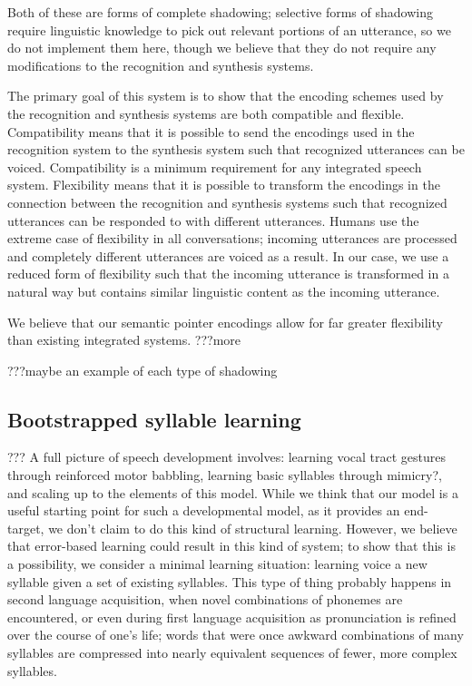 Both of these are forms of complete shadowing;
selective forms of shadowing require linguistic knowledge
to pick out relevant portions of an utterance,
so we do not implement them here,
though we believe that they
do not require any modifications
to the recognition and synthesis systems.

The primary goal of this system is to show that
the encoding schemes used by
the recognition and synthesis systems
are both compatible and flexible.
Compatibility means that it is possible
to send the encodings used in the recognition system
to the synthesis system such that
recognized utterances can be voiced.
Compatibility is a minimum requirement
for any integrated speech system.
Flexibility means that it is possible
to transform the encodings
in the connection between
the recognition and synthesis systems
such that recognized utterances
can be responded to with different utterances.
Humans use the extreme case of flexibility
in all conversations;
incoming utterances are processed
and completely different utterances
are voiced as a result.
In our case, we use a reduced form
of flexibility such that the incoming utterance
is transformed in a natural way
but contains similar linguistic content
as the incoming utterance.

We believe that our semantic pointer encodings
allow for far greater flexibility
than existing integrated systems.
???more

???maybe an example of each type of shadowing

\subsection{Bootstrapped syllable learning}

??? A full picture of speech development involves:
learning vocal tract gestures
through reinforced motor babbling,
learning basic syllables
through mimicry?,
and scaling up to the elements of this model.
While we think that our model
is a useful starting point for such
a developmental model,
as it provides an end-target,
we don't claim to do this kind of structural learning.
However, we believe that error-based learning
could result in this kind of system;
to show that this is a possibility,
we consider a minimal learning situation:
learning voice a new syllable
given a set of existing syllables.
This type of thing probably happens
in second language acquisition,
when novel combinations of phonemes
are encountered,
or even during first language acquisition
as pronunciation is refined over
the course of one's life;
words that were once awkward combinations
of many syllables are compressed into
nearly equivalent sequences of fewer,
more complex syllables.

